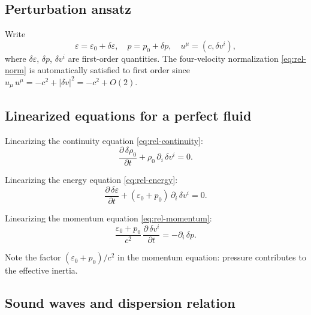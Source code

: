 \subsection{Perturbation ansatz}
\label{sec:perturbation-ansatz}

Write
\begin{equation}
  \varepsilon = \varepsilon_0 + \delta\varepsilon,
  \quad
  p = p_0 + \delta p,
  \quad
  u^{\mu} = (c, \delta v^i),
  \label{eq:perturbations}
\end{equation}
where $\delta\varepsilon$, $\delta p$, $\delta v^i$ are first-order
quantities.  The four-velocity normalization
\eqref{eq:rel-norm} is automatically satisfied to first order since
$u_{\mu}\,u^{\mu} = -c^2 + |\delta v|^2 = -c^2 + O(2)$.

\subsection{Linearized equations for a perfect fluid}
\label{sec:linearized-eqs}

Linearizing the continuity equation \eqref{eq:rel-continuity}:
\begin{equation}
  \frac{\partial\,\delta\rho_0}{\partial t}
    + \rho_0\,\partial_i\,\delta v^i = 0.
  \label{eq:lin-continuity}
\end{equation}

Linearizing the energy equation \eqref{eq:rel-energy}:
\begin{equation}
  \frac{\partial\,\delta\varepsilon}{\partial t}
    + (\varepsilon_0 + p_0)\,\partial_i\,\delta v^i = 0.
  \label{eq:lin-energy}
\end{equation}

Linearizing the momentum equation \eqref{eq:rel-momentum}:
\begin{equation}
  \frac{\varepsilon_0 + p_0}{c^2}\,
    \frac{\partial\,\delta v^i}{\partial t}
  = -\partial_i\,\delta p.
  \label{eq:lin-momentum}
\end{equation}

Note the factor $(\varepsilon_0 + p_0)/c^2$ in the momentum
equation: pressure contributes to the effective inertia.

\subsection{Sound waves and dispersion relation}
\label{sec:sound-waves}

